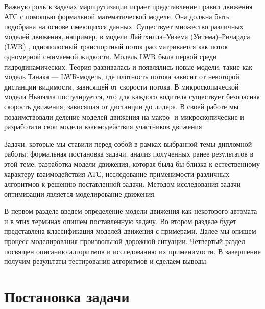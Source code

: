 \documentclass[12pt, a4paper]{article}
\begin{document}
	
	Важную роль в задачах маршрутизации играет представление правил движения АТС с помощью формальной математической модели.
	Она должна быть подобрана на основе имеющихся данных.
	Существует множество различных моделей движения, например, в модели Лайтхилла–Уизема (Уитема)–Ричардса (LWR) \cite{hydro_1}, \cite{hydro_2} однополосный транспортный поток рассматривается как поток одномерной сжимаемой жидкости. Модель LWR была первой среди гидродинамических. Теория развивалась и появлялись новые модели, такие как модель Танака \cite{Tanaka} --- LWR-модель, где плотность потока зависит от некоторой дистанции видимости, зависящей от скорости потока. В микроскопической модели Ньюэлла \cite{Newwell} постулируется, что для каждого водителя существует безопасная скорость движения, зависящая от дистанции до лидера. 
	В своей работе мы позаимствовали деление моделей движения на макро- и микроскопические \cite{book} и разработали свои модели взаимодействия участников движения.
	
	
	Задачи, которые мы ставили перед собой в рамках выбранной темы дипломной работы: формальная постановка задачи, анализ полученных ранее результатов в этой теме, разработка модели движения, которая была бы близка к естественному характеру взаимодействия АТС, исследование применимости различных алгоритмов к решению поставленной задачи. Методом исследования задачи оптимизации является моделирование движения.
	
	
	В первом разделе введем определение модели движения как некоторого автомата и в этих терминах опишем поставленную задачу. Во втором разделе будет представлена классификация моделей движения с примерами. Далее мы опишем процесс моделирования произвольной дорожной ситуации. Четвертый раздел посвящен описанию алгоритмов и исследованию их применимости. В завершение получим результаты тестирования алгоритмов и сделаем выводы.
	
	
	
	
	\newpage
	\section{Постановка задачи}
	
\end{document}
